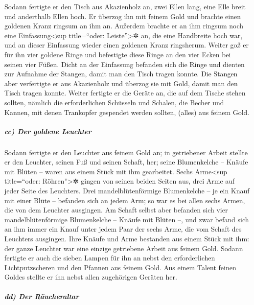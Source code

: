  Sodann fertigte er den Tisch aus Akazienholz an, zwei
Ellen lang, eine Elle breit und anderthalb Ellen hoch. 
Er überzog ihn mit feinem Gold und brachte einen goldenen Kranz ringsum
an ihm an.  Außerdem brachte er an ihm ringsum noch eine
Einfassung\textless sup title=``oder: Leiste''\textgreater✲ an, die eine
Handbreite hoch war, und an dieser Einfassung wieder einen goldenen
Kranz ringsherum.  Weiter goß er für ihn vier goldene
Ringe und befestigte diese Ringe an den vier Ecken bei seinen vier
Füßen.  Dicht an der Einfassung befanden sich die Ringe
und dienten zur Aufnahme der Stangen, damit man den Tisch tragen konnte.
 Die Stangen aber verfertigte er aus Akazienholz und
überzog sie mit Gold, damit man den Tisch tragen konnte. 
Weiter fertigte er die Geräte an, die auf dem Tische stehen sollten,
nämlich die erforderlichen Schüsseln und Schalen, die Becher und Kannen,
mit denen Trankopfer gespendet werden sollten, (alles) aus feinem Gold.

\hypertarget{cc-der-goldene-leuchter}{%
\subparagraph{cc) Der goldene Leuchter}\label{cc-der-goldene-leuchter}}

 Sodann fertigte er den Leuchter aus feinem Gold an; in
getriebener Arbeit stellte er den Leuchter, seinen Fuß und seinen
Schaft, her; seine Blumenkelche -- Knäufe mit Blüten -- waren aus einem
Stück mit ihm gearbeitet.  Sechs Arme\textless sup
title=``oder: Röhren''\textgreater✲ gingen von seinen beiden Seiten aus,
drei Arme auf jeder Seite des Leuchters.  Drei
mandelblütenförmige Blumenkelche -- je ein Knauf mit einer Blüte --
befanden sich an jedem Arm; so war es bei allen sechs Armen, die von dem
Leuchter ausgingen.  Am Schaft selbst aber befanden sich
vier mandelblütenförmige Blumenkelche -- Knäufe mit Blüten --,
 und zwar befand sich an ihm immer ein Knauf unter jedem
Paar der sechs Arme, die vom Schaft des Leuchters ausgingen.
 Ihre Knäufe und Arme bestanden aus einem Stück mit ihm:
der ganze Leuchter war eine einzige getriebene Arbeit aus feinem Gold.
 Sodann fertigte er auch die sieben Lampen für ihn an
nebst den erforderlichen Lichtputzscheren und den Pfannen aus feinem
Gold.  Aus einem Talent feinen Goldes stellte er ihn
nebst allen zugehörigen Geräten her.

\hypertarget{dd-der-ruxe4ucheraltar}{%
\subparagraph{dd) Der Räucheraltar}\label{dd-der-ruxe4ucheraltar}}

